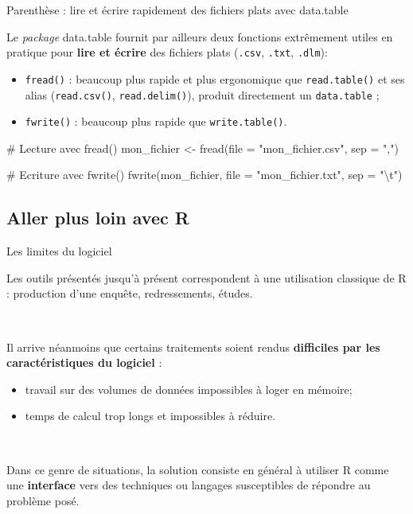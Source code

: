 \documentclass[12pt,ignorenonframetext,]{beamer}
\newenvironment{Shaded}{}{}
\newcommand{\KeywordTok}[1]{\textcolor[rgb]{0.00,0.00,1.00}{#1}}
\newcommand{\DataTypeTok}[1]{#1}
\newcommand{\CharTok}[1]{\textcolor[rgb]{0.00,0.50,0.50}{#1}}
\newcommand{\StringTok}[1]{\textcolor[rgb]{0.00,0.50,0.50}{#1}}
\newcommand{\CommentTok}[1]{\textcolor[rgb]{0.00,0.50,0.00}{#1}}
\newcommand{\NormalTok}[1]{#1}
\providecommand{\tightlist}{%
  \setlength{\itemsep}{0pt}\setlength{\parskip}{0pt}}
\renewenvironment{Shaded}{\begin{snugshade}}{\end{snugshade}}
\newcommand{\intertitre}[1]{\textcolor{redInsee}{\textbf{#1}}}
\begin{document}
\begin{frame}[fragile]{Parenthèse : lire et écrire rapidement des
fichiers plats avec data.table}

Le \emph{package} data.table fournit par ailleurs deux fonctions
extrêmement utiles en pratique pour \intertitre{lire et écrire} des
fichiers plats (\texttt{.csv}, \texttt{.txt}, \texttt{.dlm}):

\begin{itemize}
\tightlist
\item
  \pause \texttt{fread()} : beaucoup plus rapide et plus ergonomique que
  \texttt{read.table()} et ses alias (\texttt{read.csv()},
  \texttt{read.delim()}), produit directement un \texttt{data.table} ;
\item
  \pause \texttt{fwrite()} : beaucoup plus rapide que
  \texttt{write.table()}.
\end{itemize}

\footnotesize \pause

\begin{Shaded}
\begin{Highlighting}[]
\CommentTok{# Lecture avec fread()}
\NormalTok{mon_fichier <-}\StringTok{ }\KeywordTok{fread}\NormalTok{(}\DataTypeTok{file =} \StringTok{"mon_fichier.csv"}\NormalTok{, }\DataTypeTok{sep =} \StringTok{","}\NormalTok{)}

\CommentTok{# Ecriture avec fwrite()}
\KeywordTok{fwrite}\NormalTok{(mon_fichier, }\DataTypeTok{file =} \StringTok{"mon_fichier.txt"}\NormalTok{, }\DataTypeTok{sep =} \StringTok{"}\CharTok{\textbackslash{}t}\StringTok{"}\NormalTok{)}
\end{Highlighting}
\end{Shaded}

\end{frame}

\subsection{Aller plus loin avec R}\label{aller-plus-loin-avec-r}

\begin{frame}{Les limites du logiciel}

Les outils présentés jusqu'à présent correspondent à une utilisation
\og classique \fg{} de R : production d'une enquête, redressements,
études.

~

\pause Il arrive néanmoins que certains traitements soient rendus
\textbf{difficiles par les caractéristiques du logiciel} :

\begin{itemize}
\tightlist
\item
  travail sur des volumes de données impossibles à loger en mémoire;
\item
  temps de calcul trop longs et impossibles à réduire.
\end{itemize}

~

\pause Dans ce genre de situations, la solution consiste en général à
utiliser R comme une \textbf{interface} vers des techniques ou langages
susceptibles de répondre au problème posé.

\end{frame}
\end{document}
